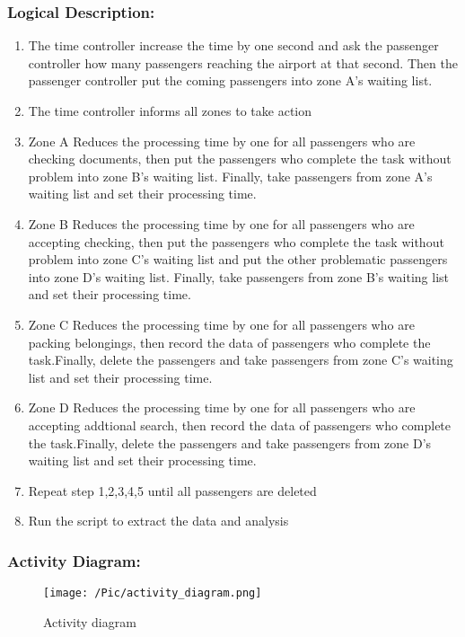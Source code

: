 \subsubsection*{Logical Description:}
\begin{enumerate}
	\item The time controller increase the time by one second and ask the passenger controller how many passengers reaching the airport at that second. Then the passenger controller put the coming passengers into zone A's waiting list.
	\item The time controller informs all zones to take action
	\item Zone A Reduces the processing time by one for all passengers who are checking documents, then put the passengers who complete the task without problem into zone B's waiting list. Finally, take passengers from zone A's waiting list and set their processing time.
	\item Zone B Reduces the processing time by one for all passengers who are accepting checking, then put the passengers who complete the task without problem into zone C's waiting list and put the other problematic passengers into zone D's waiting list. Finally, take passengers from zone B's waiting list and set their processing time.
	\item Zone C Reduces the processing time by one for all passengers who are packing belongings, then record the data of passengers who complete the task.Finally, delete the passengers and take passengers from zone C's waiting list and set their processing time.
	\item Zone D Reduces the processing time by one for all passengers who are accepting addtional search, then record the data of passengers who complete the task.Finally, delete the passengers and take passengers from zone D's waiting list and set their processing time.
	\item Repeat step 1,2,3,4,5 until all passengers are deleted
	\item Run the script to extract the data and analysis
\end{enumerate}


\subsubsection*{Activity Diagram:}
\begin{figure}[H]
\centering
\texttt{[image: /Pic/activity\_diagram.png]}
\caption{Activity diagram}\label{fig:acd}
\end{figure}

